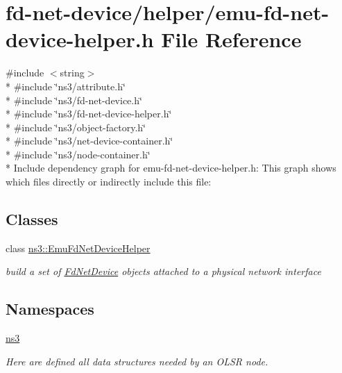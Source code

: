 \hypertarget{emu-fd-net-device-helper_8h}{}\section{fd-\/net-\/device/helper/emu-\/fd-\/net-\/device-\/helper.h File Reference}
\label{emu-fd-net-device-helper_8h}
{\ttfamily \#include $<$string$>$}\\*
{\ttfamily \#include \char`\"{}ns3/attribute.\+h\char`\"{}}\\*
{\ttfamily \#include \char`\"{}ns3/fd-\/net-\/device.\+h\char`\"{}}\\*
{\ttfamily \#include \char`\"{}ns3/fd-\/net-\/device-\/helper.\+h\char`\"{}}\\*
{\ttfamily \#include \char`\"{}ns3/object-\/factory.\+h\char`\"{}}\\*
{\ttfamily \#include \char`\"{}ns3/net-\/device-\/container.\+h\char`\"{}}\\*
{\ttfamily \#include \char`\"{}ns3/node-\/container.\+h\char`\"{}}\\*
Include dependency graph for emu-\/fd-\/net-\/device-\/helper.h\+:
This graph shows which files directly or indirectly include this file\+:
\subsection*{Classes}
\begin{DoxyCompactItemize}
\item 
class \hyperlink{classns3_1_1EmuFdNetDeviceHelper}{ns3\+::\+Emu\+Fd\+Net\+Device\+Helper}
\begin{DoxyCompactList}\small\item\em build a set of \hyperlink{classns3_1_1FdNetDevice}{Fd\+Net\+Device} objects attached to a physical network interface \end{DoxyCompactList}\end{DoxyCompactItemize}
\subsection*{Namespaces}
\begin{DoxyCompactItemize}
\item 
 \hyperlink{namespacens3}{ns3}
\begin{DoxyCompactList}\small\item\em Here are defined all data structures needed by an O\+L\+SR node. \end{DoxyCompactList}\end{DoxyCompactItemize}
